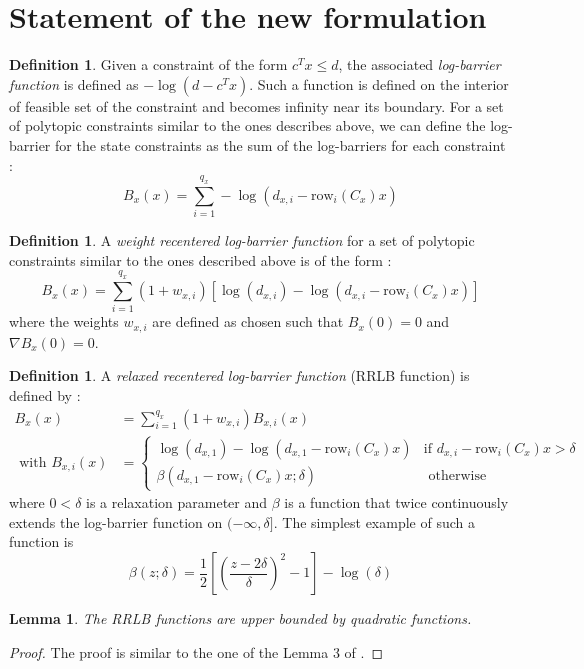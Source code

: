 \documentclass[12pt]{article}
\newtheorem{lemma}[theorem]{Lemma}
\theoremstyle{definition}
\newtheorem{definition}[theorem]{Definition}
\theoremstyle{remark}
\begin{document}
\section{Statement of the new formulation}
\begin{definition}
	Given a constraint of the form $c^Tx\leq d$, the associated \textit{log-barrier function} is defined as $-\log(d-c^Tx)$.
	Such a function is defined on the interior of feasible set of the constraint and becomes infinity near its boundary.
	For a set of polytopic constraints similar to the ones describes above, we can define the log-barrier for the state constraints as the sum of the log-barriers for each constraint :
	$$B_x(x)=\sum_{i=1}^{q_x}-\log(d_{x,i}-\mathrm{row}_i(C_x)x)$$

\end{definition}
\begin{definition}
	A \textit{weight recentered log-barrier function} for a set of polytopic constraints similar to the ones described above is of the form :
	$$B_x(x)=\sum_{i=1}^{q_x}(1+w_{x,i})\left[\log(d_{x,i})-\log(d_{x,i}-\mathrm{row}_i(C_x)x)\right]$$
	where the weights $w_{x,i}$ are defined as chosen such that $B_x(0)=0$ and $\nabla B_x(0)=0$.
\end{definition}
\begin{definition}
	A \textit{relaxed recentered log-barrier function} (RRLB function) is defined by :
	\begin{align*}
		B_x(x)&=\sum_{i=1}^{q_x}(1+w_{x,i})B_{x,i}(x)\\
		\text{ with }B_{x,i}(x)&=\begin{cases}
			\log(d_{x,1})-\log(d_{x,1}-\mathrm{row}_i(C_x)x)&\text{if }d_{x,i}-\mathrm{row}_i(C_x)x>\delta\\
			\beta(d_{x,1}-\mathrm{row}_i(C_x)x;\delta)&\text{ otherwise}
		\end{cases}
	\end{align*}
	where $0<\delta$ is a relaxation parameter and $\beta$ is a function that twice continuously extends the log-barrier function on $(-\infty,\delta]$.
	The simplest example of such a function is 
	$$\beta(z;\delta)=\frac{1}{2}\left[ \left( \frac{z-2\delta}{\delta} \right)^2-1 \right]-\log(\delta)$$
\end{definition}

\begin{lemma}
	\label{RRLB-quadratic-bound}
	The RRLB functions are upper bounded by quadratic functions.
\end{lemma}
\begin{proof}
	The proof is similar to the one of the Lemma 3 of \cite{RRLB-linear-MPC}.
\end{proof}
\end{document}
